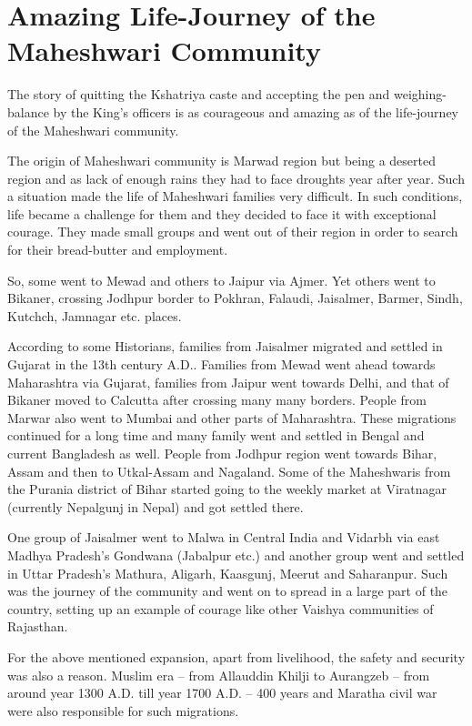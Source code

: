 \chapter{Amazing Life-Journey of the Maheshwari Community}
The story of quitting the Kshatriya caste and accepting the pen and weighing-balance by the King's officers is as courageous and amazing as of the life-journey of the Maheshwari community.

The origin of Maheshwari community is Marwad region but being a deserted region and as lack of enough rains they had to face droughts year after year. Such a situation made the life of Maheshwari families very difficult. In such conditions, life became a challenge for them and they decided to face it with exceptional courage. They made small groups and went out of their region in order to search for their bread-butter and employment.

So, some went to Mewad and others to Jaipur via Ajmer. Yet others went to Bikaner, crossing Jodhpur border to Pokhran, Falaudi, Jaisalmer, Barmer, Sindh, Kutchch, Jamnagar etc. places.

According to some Historians, families from Jaisalmer migrated and settled in Gujarat in the 13th century A.D.. Families from Mewad went ahead towards Maharashtra via Gujarat, families from Jaipur went towards Delhi, and that of Bikaner moved to Calcutta after crossing many many borders. People from Marwar also went to Mumbai and other parts of Maharashtra. These migrations continued for a long time and many family went and settled in Bengal and current Bangladesh as well. People from Jodhpur region went towards Bihar, Assam and then to Utkal-Assam and Nagaland. Some of the Maheshwaris from the Purania district of Bihar started going to the weekly market at Viratnagar (currently Nepalgunj in Nepal) and got settled there.

One group of Jaisalmer went to Malwa in Central India and Vidarbh via east Madhya Pradesh's Gondwana (Jabalpur etc.) and another group went and settled in Uttar Pradesh's Mathura, Aligarh, Kaasgunj, Meerut and Saharanpur. Such was the journey of the community and went on to spread in a large part of the country, setting up an example of courage like other Vaishya communities of Rajasthan.

For the above mentioned expansion, apart from livelihood, the safety and security was also a reason. Muslim era -- from Allauddin Khilji to Aurangzeb -- from around year 1300 A.D. till year 1700 A.D. -- 400 years and Maratha civil war were also responsible for such migrations.

